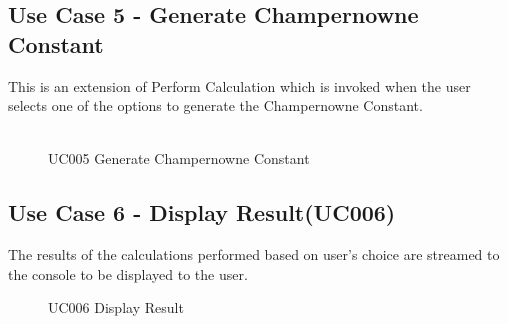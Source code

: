 \documentclass[12pt, a4paper]{report}
\begin{document}
\subsection{Use Case 5 - Generate Champernowne Constant}
\quad This is an extension of Perform Calculation which is invoked when the user selects one of the options to generate the Champernowne Constant.\\\\
\begin{figure}[h]
    \centering
    \caption{UC005 Generate Champernowne Constant}
    \label{fig:UC005 Generate Champernowne Constant}
\end{figure}

\subsection{Use Case 6 - Display Result(UC006)}
\quad The results of the calculations performed based on user's choice are streamed to the console to be displayed to the user.
\begin{figure}[h]
    \centering
    \caption{UC006 Display Result}
    \label{fig:UC006 Display Result}
\end{figure}
\end{document}
